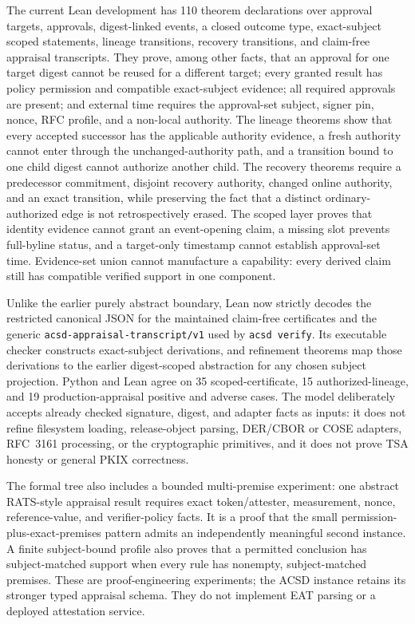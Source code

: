 \documentclass[conference,compsoc]{IEEEtran}
\begin{document}
The current Lean development has 110 theorem declarations over approval
targets, approvals, digest-linked events, a closed outcome type, exact-subject
scoped statements, lineage transitions, recovery transitions, and claim-free
appraisal transcripts. They
prove, among other facts, that an approval for one target digest cannot be
reused for a different target; every granted result has policy permission and
compatible exact-subject evidence; all required approvals are present; and
external time requires the approval-set subject, signer pin, nonce, RFC profile,
and a non-local authority. The lineage theorems show that every accepted
successor has the applicable authority evidence, a fresh authority cannot enter
through the unchanged-authority path, and a transition bound to one child
digest cannot authorize another child. The recovery theorems require a
predecessor commitment, disjoint recovery authority, changed online authority,
and an exact transition, while preserving the fact that a distinct
ordinary-authorized edge is not retrospectively erased. The scoped layer proves that identity
evidence cannot grant an event-opening claim, a missing slot prevents
full-byline status, and a target-only timestamp cannot establish approval-set
time. Evidence-set union cannot manufacture a capability: every derived claim
still has compatible verified support in one component.

Unlike the earlier purely abstract boundary, Lean now strictly decodes the
restricted canonical JSON for the maintained claim-free certificates and the
generic \texttt{acsd-appraisal-transcript/v1} used by \texttt{acsd verify}.
Its executable checker constructs exact-subject derivations, and refinement
theorems map those derivations to the earlier digest-scoped abstraction for any
chosen subject projection. Python and Lean agree on 35 scoped-certificate, 15
authorized-lineage, and 19 production-appraisal positive and adverse cases.
The model deliberately accepts already checked signature, digest, and adapter
facts as inputs: it does not refine filesystem loading, release-object parsing,
DER/CBOR or COSE adapters, RFC~3161 processing, or the cryptographic primitives,
and it does not prove TSA honesty or general PKIX correctness.

The formal tree also includes a bounded multi-premise experiment: one abstract
RATS-style appraisal result requires exact token/attester, measurement, nonce,
reference-value, and verifier-policy facts. It is a proof that the small
permission-plus-exact-premises pattern admits an independently meaningful
second instance. A finite subject-bound profile also proves that a permitted
conclusion has subject-matched support when every rule has nonempty,
subject-matched premises. These are proof-engineering experiments; the ACSD
instance retains its stronger typed appraisal schema. They do not implement
EAT parsing or a deployed attestation service.
\end{document}
